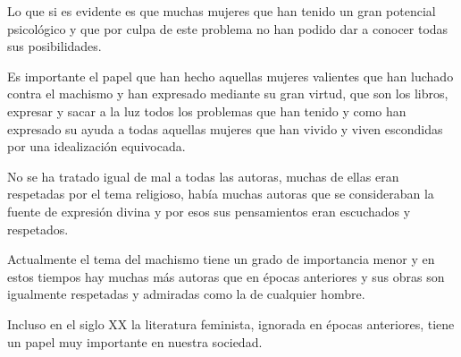 \documentclass[oneside]{book}
\begin{document}
Lo que si es evidente es que muchas mujeres que han tenido un gran potencial psicológico y que por culpa de este problema no han podido dar a conocer todas sus posibilidades.

Es importante el papel que han hecho aquellas mujeres valientes que han luchado contra el machismo y han expresado mediante su gran virtud, que son los libros, expresar y sacar a la luz todos los problemas que han tenido y como han expresado su ayuda a todas aquellas mujeres que han vivido y viven escondidas por una idealización equivocada.



No se ha tratado igual de mal a todas las autoras, muchas de ellas eran respetadas por el tema religioso, había muchas autoras que se consideraban la fuente de expresión divina y por esos sus pensamientos eran escuchados y respetados.

Actualmente el tema del machismo tiene un grado de importancia menor y en estos tiempos hay muchas más autoras que en épocas anteriores y sus obras son igualmente respetadas y admiradas como la de cualquier hombre.

Incluso en el siglo XX la literatura feminista, ignorada en épocas anteriores, tiene un papel muy importante en nuestra sociedad.


\printindex


\end{document}
